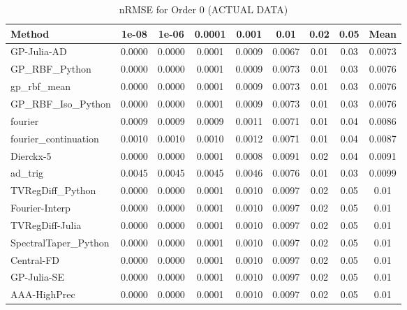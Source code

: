 \begin{table}[htbp]
\centering
\caption{nRMSE for Order 0 (ACTUAL DATA)}
\label{tab:order_0}
\tiny
\begin{tabular}{lcccccccc}
\toprule
\textbf{Method} & \textbf{1e-08} & \textbf{1e-06} & \textbf{0.0001} & \textbf{0.001} & \textbf{0.01} & \textbf{0.02} & \textbf{0.05} & \textbf{Mean} \\
\midrule
GP-Julia-AD & 0.0000 & 0.0000 & 0.0001 & 0.0009 & 0.0067 & 0.01 & 0.03 & 0.0073 \\
GP_RBF_Python & 0.0000 & 0.0000 & 0.0001 & 0.0009 & 0.0073 & 0.01 & 0.03 & 0.0076 \\
gp_rbf_mean & 0.0000 & 0.0000 & 0.0001 & 0.0009 & 0.0073 & 0.01 & 0.03 & 0.0076 \\
GP_RBF_Iso_Python & 0.0000 & 0.0000 & 0.0001 & 0.0009 & 0.0073 & 0.01 & 0.03 & 0.0076 \\
fourier & 0.0009 & 0.0009 & 0.0009 & 0.0011 & 0.0071 & 0.01 & 0.04 & 0.0086 \\
fourier_continuation & 0.0010 & 0.0010 & 0.0010 & 0.0012 & 0.0071 & 0.01 & 0.04 & 0.0087 \\
Dierckx-5 & 0.0000 & 0.0000 & 0.0001 & 0.0008 & 0.0091 & 0.02 & 0.04 & 0.0091 \\
ad_trig & 0.0045 & 0.0045 & 0.0045 & 0.0046 & 0.0076 & 0.01 & 0.03 & 0.0099 \\
TVRegDiff_Python & 0.0000 & 0.0000 & 0.0001 & 0.0010 & 0.0097 & 0.02 & 0.05 & 0.01 \\
Fourier-Interp & 0.0000 & 0.0000 & 0.0001 & 0.0010 & 0.0097 & 0.02 & 0.05 & 0.01 \\
TVRegDiff-Julia & 0.0000 & 0.0000 & 0.0001 & 0.0010 & 0.0097 & 0.02 & 0.05 & 0.01 \\
SpectralTaper_Python & 0.0000 & 0.0000 & 0.0001 & 0.0010 & 0.0097 & 0.02 & 0.05 & 0.01 \\
Central-FD & 0.0000 & 0.0000 & 0.0001 & 0.0010 & 0.0097 & 0.02 & 0.05 & 0.01 \\
GP-Julia-SE & 0.0000 & 0.0000 & 0.0001 & 0.0010 & 0.0097 & 0.02 & 0.05 & 0.01 \\
AAA-HighPrec & 0.0000 & 0.0000 & 0.0001 & 0.0010 & 0.0097 & 0.02 & 0.05 & 0.01 \\
\bottomrule
\end{tabular}
\end{table}
